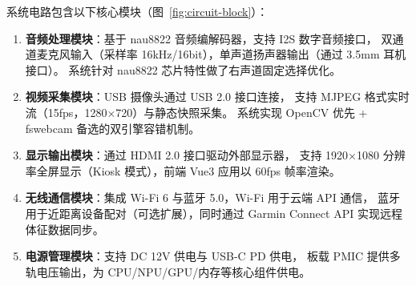 \documentclass[12pt, a4paper]{ctexart}
\begin{document}
系统电路包含以下核心模块（图~\ref{fig:circuit-block}）：

\begin{enumerate}[leftmargin=2em, itemsep=2pt]
  \item \textbf{音频处理模块}：基于 nau8822 音频编解码器，支持 I2S 数字音频接口，
    双通道麦克风输入（采样率 16kHz/16bit），单声道扬声器输出（通过 3.5mm 耳机接口）。
    系统针对 nau8822 芯片特性做了右声道固定选择优化。

  \item \textbf{视频采集模块}：USB 摄像头通过 USB 2.0 接口连接，
    支持 MJPEG 格式实时流（15fps，1280×720）与静态快照采集。
    系统实现 OpenCV 优先 + fswebcam 备选的双引擎容错机制。

  \item \textbf{显示输出模块}：通过 HDMI 2.0 接口驱动外部显示器，
    支持 1920×1080 分辨率全屏显示（Kiosk 模式），前端 Vue3 应用以 60fps 帧率渲染。

  \item \textbf{无线通信模块}：集成 Wi-Fi 6 与蓝牙 5.0，Wi-Fi 用于云端 API 通信，
    蓝牙用于近距离设备配对（可选扩展），同时通过 Garmin Connect API 实现远程体征数据同步。

  \item \textbf{电源管理模块}：支持 DC 12V 供电与 USB-C PD 供电，
    板载 PMIC 提供多轨电压输出，为 CPU/NPU/GPU/内存等核心组件供电。
\end{enumerate}
\end{document}
